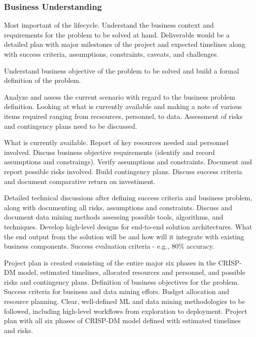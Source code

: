 \hypertarget{business-understanding}{%
\subsubsection{Business Understanding}\label{business-understanding}}

Most important of the lifecycle. Understand the business context and
requirements for the problem to be solved at hand. Deliverable would be
a detailed plan with major milestones of the project and expected
timelines along with success criteria, assumptions, constraints,
caveats, and challenges.

Understand business objective of the problem to be solved and build a
formal definition of the problem.

Analyze and assess the current scenario with regard to the business
problem definition. Looking at what is currently available and making a
note of various items required ranging from recsources, personnel, to
data. Assessment of risks and contingency plans need to be discussed.

What is currently available. Report of key resources needed and
personnel involved. Discuss business objective requirements (identify
and record assumptions and constraings). Verify assumptions and
constraints. Document and report possible risks involved. Build
contingency plans. Discuss success criteria and document comparative
return on investiment.

Detailed technical discussions after defining success criteria and
business problem, along with documenting all risks, assumptions and
constraints. Discuss and document data mining methods assessing possible
tools, algorithms, and techniques. Develop high-level designs for
end-to-end solution architectures. What the end output from the solution
will be and how will it integrate with existing business components.
Success evaluation criteria - e.g., 80\% accuracy.

Project plan is created consisting of the entire major six phases in the
CRISP-DM model, estimated timelines, allocated resources and personnel,
and possible risks and contingency plans. Definition of business
objectives for the problem. Success criteria for business and data
mining effors. Budget allocation and resource planning. Clear,
well-defined ML and data mining methodologies to be followed, including
high-level workflows from exploration to deployment. Project plan with
all six phases of CRISP-DM model defined with estimated timelines and
risks.

